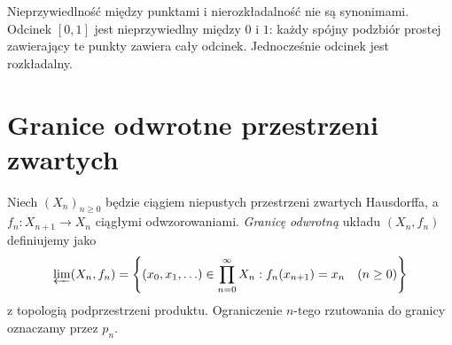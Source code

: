 \begin{uwaga}
\label{rem:topog25-irred-vs-indec}
Nieprzywiedlność między punktami
i nierozkładalność nie są synonimami.
Odcinek \([0,1]\) jest
nieprzywiedlny między \(0\) i \(1\):
każdy spójny podzbiór prostej
zawierający te punkty zawiera
cały odcinek. Jednocześnie
odcinek jest rozkładalny.
\end{uwaga}

\section{Granice odwrotne przestrzeni zwartych}
\label{sec:topog25-inverse}

\begin{definicja}
\label{def:topog25-inverse-limit}
Niech \((X_n)_{n\ge0}\) będzie
ciągiem niepustych przestrzeni
zwartych Hausdorffa, a
\(f_n\colon X_{n+1}\to X_n\)
ciągłymi odwzorowaniami.
\emph{Granicę odwrotną} układu
\((X_n,f_n)\) definiujemy jako
\[
 \varprojlim(X_n,f_n)=
 \left\{(x_0,x_1,\ldots)\in
  \prod_{n=0}^{\infty}X_n:
  f_n(x_{n+1})=x_n\quad(n\ge0)\right\}
\]
z topologią podprzestrzeni
produktu. Ograniczenie \(n\)-tego
rzutowania do granicy oznaczamy
przez \(p_n\).
\end{definicja}

